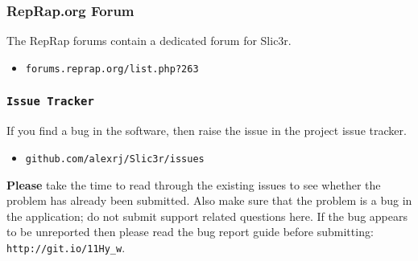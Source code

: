 
\subsubsection{RepRap.org Forum} %
\label{sub:reprap_org_forum}


The RepRap forums contain a dedicated forum for Slic3r.
\begin{itemize}
    \item \texttt{forums.reprap.org/list.php?263}
\end{itemize}


\subsubsection{\texttt{Issue Tracker}} %
\label{sub:issue_tracker}

If you find a bug in the software, then raise the issue in the project issue tracker.

\begin{itemize}
    \item \texttt{github.com/alexrj/Slic3r/issues}
\end{itemize}

\textbf{Please} take the time to read through the existing issues to see whether the problem has already been submitted.  Also make sure that the problem is a bug in the application; do not submit support related questions here.
If the bug appears to be unreported then please read the bug report guide before submitting: \texttt{http://git.io/11Hy\_w}.


